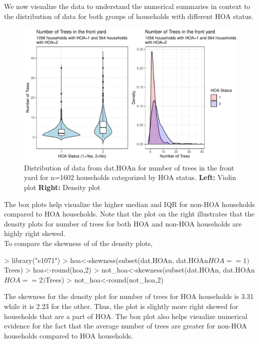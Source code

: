 \documentclass{article}
\begin{document}
We now visualize the data to understand the numerical summaries in context to the distribution of data for both groups of households with different HOA status. \\

\begin{figure}[H]
\centering
\includegraphics{part2-008}
\caption{Distribution of data from dat.HOAn for number of trees in the front yard for n=1602 households categorized by HOA status. \textbf{Left:} Violin plot \textbf{Right:} Density plot} \label{Fig:Plot1}
\end{figure}

The box plots help visualize the higher median and IQR for non-HOA households compared to HOA households. Note that the plot on the right illustrates that the density plots for number of trees for both HOA and non-HOA households are highly right skewed.\\

To compare the skewness of of the density plots,
\begin{Schunk}
\begin{Sinput}
> library("e1071")
> hoa<-skewness(subset(dat.HOAn, dat.HOAn$HOA==1)$Trees)
> hoa<-round(hoa,2)
> not_hoa<-skewness(subset(dat.HOAn, dat.HOAn$HOA==2)$Trees)
> not_hoa<-round(not_hoa,2)
\end{Sinput}
\end{Schunk}

The skewness for the density plot for number of trees for HOA households is 3.31 while it is 2.23 for the other. Thus, the plot is slightly more right skewed for households that are a part of HOA. The box plot also helps visualize numerical evidence for the fact that the average number of trees are greater for non-HOA households compared to HOA households.\\
\end{document}
